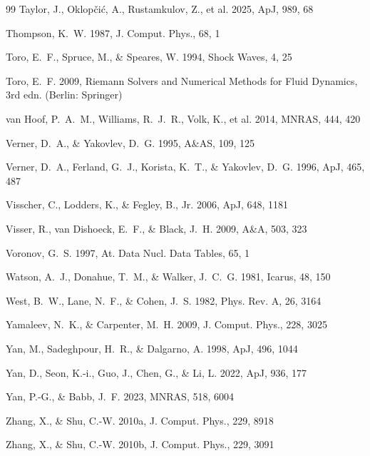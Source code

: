 \begin{thebibliography}{99}
Taylor, J., Oklop\v{c}i\'c, A., Rustamkulov, Z., et al. 2025, ApJ, 989, 68

Thompson, K.~W. 1987, J. Comput. Phys., 68, 1

Toro, E.~F., Spruce, M., \& Speares, W. 1994, Shock Waves, 4, 25

Toro, E.~F. 2009, Riemann Solvers and Numerical Methods for Fluid Dynamics,
3rd edn. (Berlin: Springer)

van Hoof, P.~A.~M., Williams, R.~J.~R., Volk, K., et al. 2014,
MNRAS, 444, 420

Verner, D.~A., \& Yakovlev, D.~G. 1995, A\&AS, 109, 125

Verner, D.~A., Ferland, G.~J., Korista, K.~T., \& Yakovlev, D.~G. 1996,
ApJ, 465, 487

Visscher, C., Lodders, K., \& Fegley, B., Jr. 2006, ApJ, 648, 1181

Visser, R., van Dishoeck, E.~F., \& Black, J.~H. 2009, A\&A, 503, 323

Voronov, G.~S. 1997, At. Data Nucl. Data Tables, 65, 1

Watson, A.~J., Donahue, T.~M., \& Walker, J.~C.~G. 1981, Icarus, 48, 150

West, B.~W., Lane, N.~F., \& Cohen, J.~S. 1982, Phys. Rev. A, 26, 3164

Yamaleev, N.~K., \& Carpenter, M.~H. 2009, J. Comput. Phys., 228, 3025

Yan, M., Sadeghpour, H.~R., \& Dalgarno, A. 1998, ApJ, 496, 1044

Yan, D., Seon, K.-i., Guo, J., Chen, G., \& Li, L. 2022, ApJ, 936, 177

Yan, P.-G., \& Babb, J.~F. 2023, MNRAS, 518, 6004

Zhang, X., \& Shu, C.-W. 2010a, J. Comput. Phys., 229, 8918

Zhang, X., \& Shu, C.-W. 2010b, J. Comput. Phys., 229, 3091


\end{thebibliography}
